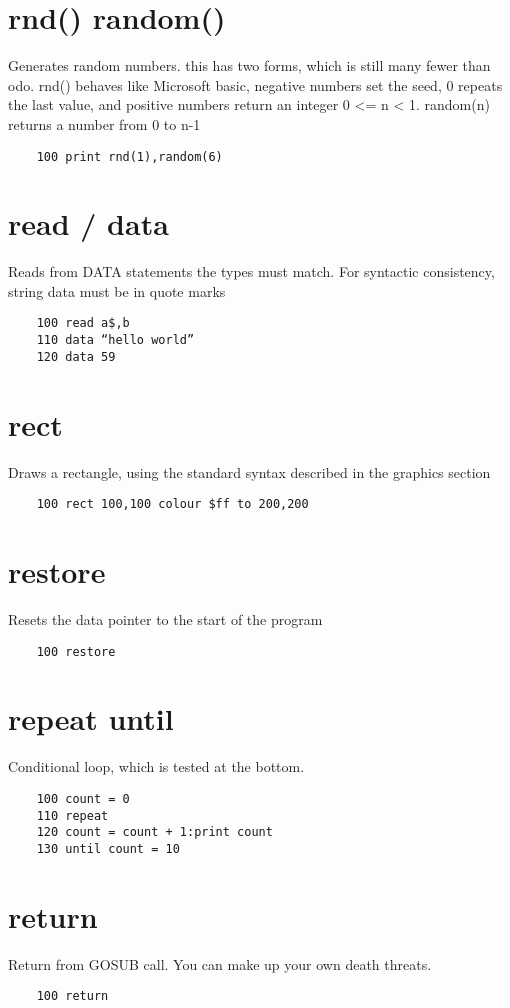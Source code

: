\section*{rnd() random()}
Generates random numbers. this has two forms, which is still many fewer than odo. rnd() behaves like Microsoft basic, negative numbers set the seed,  0 repeats the last value, and positive numbers return an integer 0 <= n < 1. random(n) returns a number from 0 to n-1
\example{}
\begin{verbatim}
	100 print rnd(1),random(6)
\end{verbatim}

\section*{read / data}
Reads from DATA statements the types must match. For syntactic consistency, string data must be in quote marks
\example{}
\begin{verbatim}
	100 read a$,b
	110 data “hello world”
	120 data 59
\end{verbatim}

\section*{rect}
Draws a rectangle, using the standard syntax described in the graphics section
\example{}
\begin{verbatim}
	100 rect 100,100 colour $ff to 200,200
\end{verbatim}

\section*{restore}
Resets the data pointer to the start of the program
\example{}
\begin{verbatim}
	100 restore
\end{verbatim}

\section*{repeat until}
Conditional loop, which is tested at the bottom.
\example{}
\begin{verbatim}
	100 count = 0
	110 repeat
	120 count = count + 1:print count
	130 until count = 10
\end{verbatim}

\section*{return}
Return from GOSUB call. You can make up your own death threats.
\example{}
\begin{verbatim}
	100 return
\end{verbatim}

